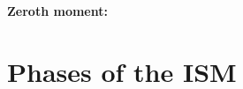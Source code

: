 \documentclass[a4paper,10pt]{article}
\begin{document}
{\noindent}\textbf{Zeroth moment:} 




















































\newpage
\section{Phases of the ISM}
\label{sec:ism}
\end{document}
